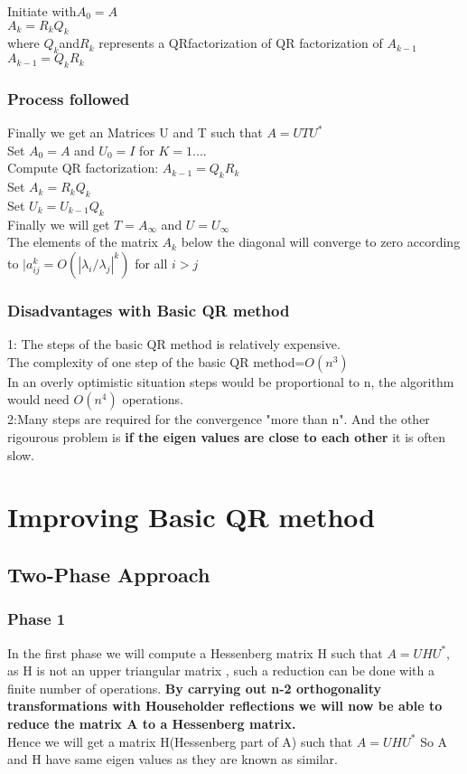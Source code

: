 \documentclass[a4paper,12pt]{article}
\begin{document}
    Initiate with$ A_0=A$\\
    $A_k=R_kQ_k$\\
  where $Q_k $and$ R_k$
represents a  QRfactorization of 
 QR factorization of $A_{k−1}$\\
$A_{k-1}=Q_kR_k$
  
 \subsubsection{Process followed }
 Finally we get an Matrices U and T such that $A=UTU^*$\\
 Set $A_0=A$ and $U_0=I$
 for $K=1....$\\
 Compute QR factorization: $A_{k-1}=Q_kR_k$\\
 Set $A_k=R_kQ_k$\\
 Set $U_k=U_{k-1}Q_k$\\
 Finally we will get $T=A_\infty$ and $U=U_\infty$\\
  The elements of the matrix $A_k$ below the diagonal will converge to zero according to 
  $|a_{ij}^{k}=O(|\lambda_i/\lambda_j|^k)$ for all $i>j$
  \subsubsection{Disadvantages with Basic QR method}
  1: The steps of the basic QR method is relatively expensive.\\
  The complexity of one step of the basic QR method=$O(n^3)$\\
  In an overly optimistic situation steps would be proportional to n, the algorithm would need $O(n^4)$ operations.\\
  2:Many steps are required for the convergence "more than n". And the other rigourous problem is \textbf{if the eigen values are close to each other} it is often slow.\\
  \section{Improving Basic QR method}
  \subsection{Two-Phase Approach}
  \subsubsection{Phase 1}
 In the first phase we will compute a Hessenberg matrix H such that $A=UHU^*$, as H is not an upper triangular matrix , such a reduction can be done with a finite number of operations.
 \textbf{By carrying out n-2 orthogonality transformations with Householder reflections we will now be able to reduce the matrix A to a Hessenberg matrix.}\\
 Hence we will get a matrix H(Hessenberg part of A) such that $A=UHU^*$ So A and H have same eigen values as they are known as similar.
 
\end{document}
